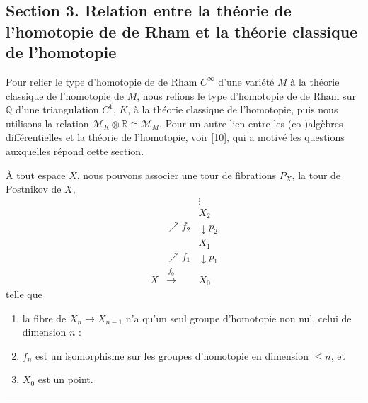 \documentclass[
  french,
  a3paper,
  a3paper]{extarticle}
\begin{document}
\subsection{Section 3. Relation entre la théorie de l'homotopie de de
Rham et la théorie classique de
l'homotopie}\label{section-3.-relation-entre-la-thuxe9orie-de-lhomotopie-de-de-rham-et-la-thuxe9orie-classique-de-lhomotopie}

Pour relier le type d'homotopie de de Rham \(C^\infty\) d'une variété
\(M\) à la théorie classique de l'homotopie de \(M\), nous relions le
type d'homotopie de de Rham sur \(\mathbb Q\) d'une triangulation
\(C^1\), \(K\), à la théorie classique de l'homotopie, puis nous
utilisons la relation \(\mathcal M_K\otimes\mathbb R\cong\mathcal M_M\).
Pour un autre lien entre les (co-)algèbres différentielles et la théorie
de l'homotopie, voir {[}10{]}, qui a motivé les questions auxquelles
répond cette section.

À tout espace \(X\), nous pouvons associer une tour de fibrations
\(P_X\), la tour de Postnikov de \(X\), \[
\begin{array}{ccc}
&&\vdots\\
&&X_2\\
&\nearrow\scriptstyle f_2&\downarrow\scriptstyle p_2\\
&&X_1\\
&\nearrow\scriptstyle f_1&\downarrow\scriptstyle p_1\\
X&\xrightarrow{\ f_0\ }&X_0
\end{array}
\] telle que

\begin{enumerate}
\def\labelenumi{\arabic{enumi})}
\item
  la fibre de \(X_n\to X_{n-1}\) n'a qu'un seul groupe d'homotopie non
  nul, celui de dimension \(n\) :
\item
  \(f_n\) est un isomorphisme sur les groupes d'homotopie en dimension
  \(\le n\), et
\item
  \(X_0\) est un point.
\end{enumerate}

\clearpage



\par

\vspace{0.7mm}\hrule\vspace{1.6mm}
\end{document}
